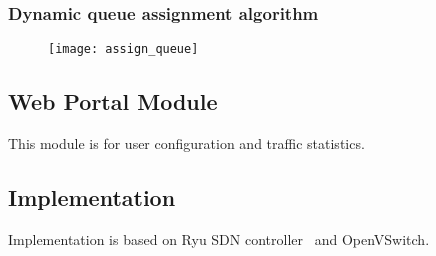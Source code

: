 \subsubsection{Dynamic queue assignment algorithm}

\begin{figure}[htb]
\centering
\texttt{[image: assign\_queue]}
\caption{}
\label{fig:assign_queue}
\end{figure}

\subsection{Web Portal Module}
This module is for user configuration and traffic statistics.
\subsection{Implementation}
Implementation is based on Ryu SDN controller~\cite{ryu} and OpenVSwitch.
